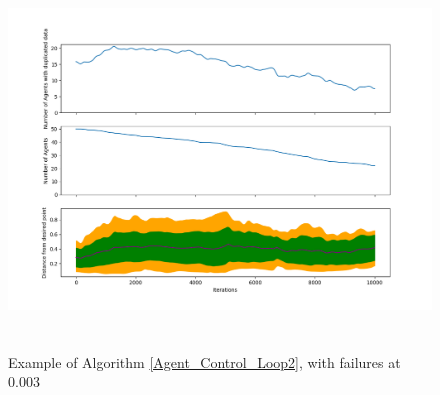 \documentclass{UoYCSproject}
\begin{document}
\begin{figure}[htb]
\label{fig:Data11}
\begin{center}
\centering
\includegraphics[width=\linewidth, height=10cm]{"./PrelimData/Non_correlated_errors_test2_0.8_0.45.png"}
\caption{Example of Algorithm \ref{Agent_Control_Loop2}, with failures at 0.003}
\end{center}
\end{figure}
\end{document}
